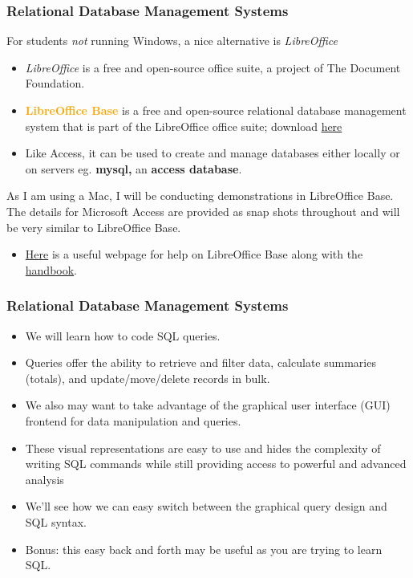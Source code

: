 \documentclass[xcolor=svgnames]{beamer}
\newcommand{\define}[1]{\textbf{\textcolor{orange}{#1}}}
\theoremstyle{example}
\newcommand{\ft}[1]{\frametitle{#1}}
\begin{document}
\begin{frame}\ft{Relational Database Management Systems}
For students \textit{not} running Windows, a nice alternative is \emph{LibreOffice}
\begin{itemize}
\item  \emph{LibreOffice} is a free and open-source office suite, a project of The Document Foundation. 
\item \define{LibreOffice Base} is a free and open-source relational database management system that is part of the LibreOffice office suite; download \href{https://www.libreoffice.org/download/download/}{here}
\item Like Access, it can be used to create and manage databases either locally or on servers eg. {\bf mysql,} an {\bf access database}.
\end{itemize}
\medskip
As I am using a Mac, I will be conducting demonstrations in LibreOffice Base.  The details for Microsoft Access are provided as snap shots throughout and will be very similar to LibreOffice Base.
\begin{itemize}
\item \href{https://thefrugalcomputerguy.com/seriespg.php?ser=15/}{Here} is a useful webpage for help on LibreOffice Base along with the \href{https://wiki.documentfoundation.org/images/e/e8/BH40-BaseHandbook.pdf}{handbook}.
\end{itemize}

\end{frame}



\begin{frame}\ft{Relational Database Management Systems}
\begin{itemize}
\item We will learn how to code SQL queries.
\item Queries offer the ability to retrieve and filter data, calculate summaries (totals), and update/move/delete records in bulk.
\item We also may want to take advantage of the graphical user interface (GUI)  frontend for data manipulation and queries.
\item These visual representations %
are easy to use and hides the complexity of writing SQL commands while still providing access to  powerful and advanced analysis
\item   We'll see how we can easy switch between the graphical query design and SQL syntax. 
\item Bonus: this easy back and forth may be useful as you are trying to learn SQL.
\end{itemize}
\end{frame}
\end{document}
